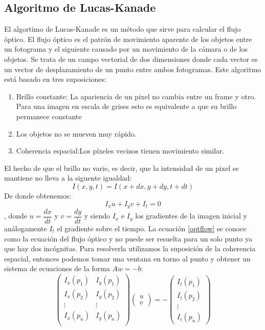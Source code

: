\documentclass[a4paper,openright, 12pt]{book}
\begin{document}
\newpage
\subsection{Algoritmo de Lucas-Kanade}
El algortimo de Lucas-Kanade es un método que sirve para calcular el flujo óptico.
El flujo óptico es el patrón de movimiento aparente de los objetos entre un fotograma y el siguiente causado por un movimiento de la cámara o de los objetos. Se trata de un campo vectorial de dos dimensiones donde cada vector es un vector de desplazamiento de un punto entre ambos fotogramas.
Este algoritmo está basado en tres suposiciones:
\begin{enumerate}
\item Brillo constante: La apariencia de un pixel no cambia entre un frame y otro. Para una imagen en escala de grises esto es equivalente a que su brillo permanece constante
\item Los objetos no se mueven muy rápido.
\item Coherencia espacial:Los píxeles vecinos tienen movimiento similar.
\end{enumerate}
El hecho de que el brillo no varie, es decir, que la intensidad de un pixel se mantiene no lleva a la siguente igualdad:
\begin{equation}
I(x,y,t)=I(x+dx,y+dy,t+dt)
\end{equation}
De donde obtenemos:
\begin{equation}
\label{optflow}
I_x u + I_y v + I_t = 0
\end{equation}
, donde $u= \dfrac{dx}{dt}$ y $v= \dfrac{dy}{dt}$ y siendo $I_x$ e $I_y$ los gradientes de la imagen inicial y análogamente $I_t$ el gradiente sobre el tiempo.
La ecuación \ref{optflow} se conoce como la ecuación del flujo óptico y no puede ser resuelta para un solo punto ya que hay dos incógnitas.
Para resolverla utilizamos la suposición de la coherencia espacial, entonces podemos tomar una ventana en torno al punto y obtener un sistema de ecuaciones de la forma $Aw=-b$:
\begin{equation}
\left(
\begin{matrix}
I_x(p_1) & I_y(p_1)\\
I_x(p_2) & I_y(p_2)\\
\vdots & \vdots \\
I_x(p_n) & I_y(p_n)\\
\end{matrix}
\right)
\left(\begin{array}{c}u\\v\end{array}\right)
=
- \left(\begin{array}{c} I_t(p_1)\\I_t(p_2)\\ \vdots\\ I_t(p_n)\end{array}\right)
\end{equation}
\end{document}
